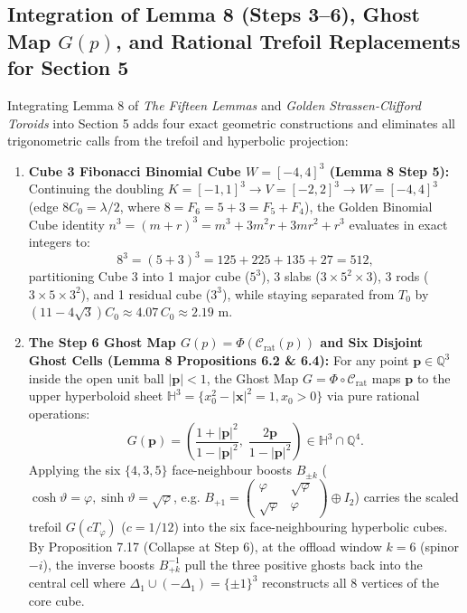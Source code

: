 \documentclass[11pt, a4paper]{article}
\begin{document}
\subsection{Integration of Lemma 8 (Steps 3--6), Ghost Map \texorpdfstring{$G(p)$}{G(p)}, and Rational Trefoil Replacements for Section 5}
Integrating Lemma 8 of \textit{The Fifteen Lemmas} and \textit{Golden Strassen-Clifford Toroids} into Section 5 adds four exact geometric constructions and eliminates all trigonometric calls from the trefoil and hyperbolic projection:
\begin{enumerate}
    \item \textbf{Cube 3 Fibonacci Binomial Cube $W = [-4, 4]^3$ (Lemma 8 Step 5):}
    Continuing the doubling $K = [-1,1]^3 \to V = [-2,2]^3 \to W = [-4,4]^3$ (edge $8C_0 = \lambda/2$, where $8 = F_6 = 5 + 3 = F_5 + F_4$), the Golden Binomial Cube identity $n^3 = (m+r)^3 = m^3 + 3m^2 r + 3m r^2 + r^3$ evaluates in exact integers to:
    \begin{equation}
    8^3 = (5 + 3)^3 = 125 + 225 + 135 + 27 = 512,
    \end{equation}
    partitioning Cube 3 into 1 major cube ($5^3$), 3 slabs ($3 \times 5^2 \times 3$), 3 rods ($3 \times 5 \times 3^2$), and 1 residual cube ($3^3$), while staying separated from $T_0$ by $(11 - 4\sqrt{3})C_0 \approx 4.07\,C_0 \approx 2.19\text{ m}$.
    \item \textbf{The Step 6 Ghost Map $G(p) = \Phi(\mathcal{C}_{\text{rat}}(p))$ and Six Disjoint Ghost Cells (Lemma 8 Propositions 6.2 \& 6.4):}
    For any point $\mathbf{p} \in \mathbb{Q}^3$ inside the open unit ball $|\mathbf{p}| < 1$, the Ghost Map $G = \Phi \circ \mathcal{C}_{\text{rat}}$ maps $\mathbf{p}$ to the upper hyperboloid sheet $\mathbb{H}^3 = \{x_0^2 - |\mathbf{x}|^2 = 1, x_0 > 0\}$ via pure rational operations:
    \begin{equation}
    G(\mathbf{p}) = \left(\frac{1 + |\mathbf{p}|^2}{1 - |\mathbf{p}|^2},\; \frac{2\mathbf{p}}{1 - |\mathbf{p}|^2}\right) \in \mathbb{H}^3 \cap \mathbb{Q}^4.
    \end{equation}
    Applying the six $\{4,3,5\}$ face-neighbour boosts $B_{\pm k}$ ($\cosh\vartheta = \varphi, \sinh\vartheta = \sqrt{\varphi}$, e.g. $B_{+1} = \begin{pmatrix}\varphi & \sqrt{\varphi}\\ \sqrt{\varphi} & \varphi\end{pmatrix} \oplus I_2$) carries the scaled trefoil $G(c T_\varphi)$ ($c = 1/12$) into the six face-neighbouring hyperbolic cubes. By Proposition 7.17 (Collapse at Step 6), at the offload window $k=6$ (spinor $-i$), the inverse boosts $B_{+k}^{-1}$ pull the three positive ghosts back into the central cell where $\Delta_1 \cup (-\Delta_1) = \{\pm 1\}^3$ reconstructs all 8 vertices of the core cube.

\end{enumerate}
\end{document}
